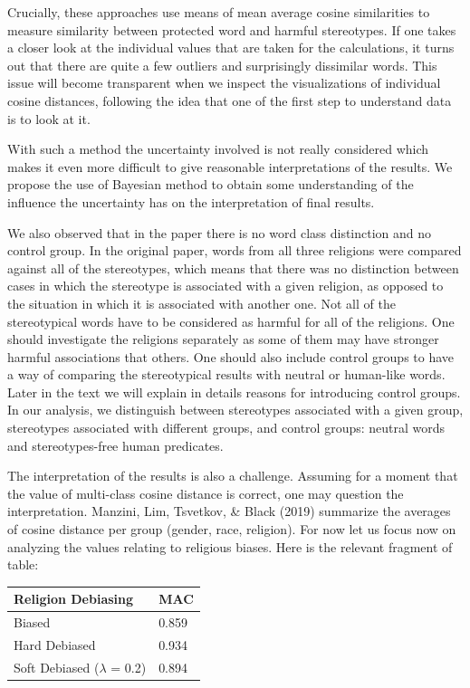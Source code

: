 \documentclass[
  10pt,
  dvipsnames,enabledeprecatedfontcommands]{scrartcl}
\begin{document}
Crucially, these approaches use means of mean average cosine
similarities to measure similarity between protected word and harmful
stereotypes. If one takes a closer look at the individual values that
are taken for the calculations, it turns out that there are quite a few
outliers and surprisingly dissimilar words. This issue will become
transparent when we inspect the visualizations of individual cosine
distances, following the idea that one of the first step to understand
data is to look at it.

With such a method the uncertainty involved is not really considered
which makes it even more difficult to give reasonable interpretations of
the results. We propose the use of Bayesian method to obtain some
understanding of the influence the uncertainty has on the interpretation
of final results.

We also observed that in the paper there is no word class distinction
and no control group. In the original paper, words from all three
religions were compared against all of the stereotypes, which means that
there was no distinction between cases in which the stereotype is
associated with a given religion, as opposed to the situation in which
it is associated with another one. Not all of the stereotypical words
have to be considered as harmful for all of the religions. One should
investigate the religions separately as some of them may have stronger
harmful associations that others. One should also include control groups
to have a way of comparing the stereotypical results with neutral or
human-like words. Later in the text we will explain in details reasons
for introducing control groups. In our analysis, we distinguish between
stereotypes associated with a given group, stereotypes associated with
different groups, and control groups: neutral words and stereotypes-free
human predicates.

The interpretation of the results is also a challenge. Assuming for a
moment that the value of multi-class cosine distance is correct, one may
question the interpretation. Manzini, Lim, Tsvetkov, \& Black (2019)
summarize the averages of cosine distance per group (gender, race,
religion). For now let us focus now on analyzing the values relating to
religious biases. Here is the relevant fragment of table:

\begin{longtable}[]{@{}ll@{}}
\toprule
Religion Debiasing & MAC \\
\midrule
\endhead
Biased & 0.859 \\
Hard Debiased & 0.934 \\
Soft Debiased (\(\lambda\) = 0.2) & 0.894 \\
\bottomrule
\end{longtable}
\end{document}

